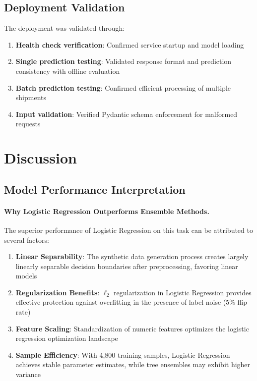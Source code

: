 \documentclass[11pt,a4paper]{article}
\begin{document}
\subsection{Deployment Validation}

The deployment was validated through:
\begin{enumerate}
    \item \textbf{Health check verification}: Confirmed service startup and model loading
    \item \textbf{Single prediction testing}: Validated response format and prediction consistency with offline evaluation
    \item \textbf{Batch prediction testing}: Confirmed efficient processing of multiple shipments
    \item \textbf{Input validation}: Verified Pydantic schema enforcement for malformed requests
\end{enumerate}

\section{Discussion}
\label{sec:discussion}

\subsection{Model Performance Interpretation}

\paragraph{Why Logistic Regression Outperforms Ensemble Methods.}
The superior performance of Logistic Regression on this task can be attributed to several factors:

\begin{enumerate}
    \item \textbf{Linear Separability}: The synthetic data generation process creates largely linearly separable decision boundaries after preprocessing, favoring linear models
    \item \textbf{Regularization Benefits}: $\ell_2$ regularization in Logistic Regression provides effective protection against overfitting in the presence of label noise (5\% flip rate)
    \item \textbf{Feature Scaling}: Standardization of numeric features optimizes the logistic regression optimization landscape
    \item \textbf{Sample Efficiency}: With 4,800 training samples, Logistic Regression achieves stable parameter estimates, while tree ensembles may exhibit higher variance
\end{enumerate}
\end{document}
